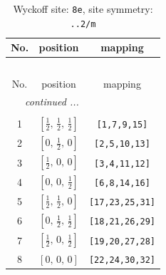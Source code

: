 \documentclass[fleqn,8pt]{jsarticle}
\begin{document}
\renewcommand{\arraystretch}{1.2}
\begin{longtable}{ccc}
\caption{Wyckoff site: {\tt 8e}, site symmetry: {\tt ..2/m}}
 \\
 \hline \hline
No. & position & mapping \\ \hline \endfirsthead

\multicolumn{2}{l}{\tablename\ \thetable{}} \\
 \hline \hline
No. & position & mapping \\ \hline \endhead

 \hline \hline
\multicolumn{2}{r}{\footnotesize\it continued ...} \\ \endfoot

 \hline \hline
\multicolumn{2}{r}{} \\ \endlastfoot

1 & $\left[ \frac{1}{2},\, \frac{1}{2},\, \frac{1}{2} \right]$ & {\tt [1,7,9,15]} \\ \hline
2 & $\left[ 0,\, \frac{1}{2},\, 0 \right]$ & {\tt [2,5,10,13]} \\ \hline
3 & $\left[ \frac{1}{2},\, 0,\, 0 \right]$ & {\tt [3,4,11,12]} \\ \hline
4 & $\left[ 0,\, 0,\, \frac{1}{2} \right]$ & {\tt [6,8,14,16]} \\ \hline
5 & $\left[ \frac{1}{2},\, \frac{1}{2},\, 0 \right]$ & {\tt [17,23,25,31]} \\ \hline
6 & $\left[ 0,\, \frac{1}{2},\, \frac{1}{2} \right]$ & {\tt [18,21,26,29]} \\ \hline
7 & $\left[ \frac{1}{2},\, 0,\, \frac{1}{2} \right]$ & {\tt [19,20,27,28]} \\ \hline
8 & $\left[ 0,\, 0,\, 0 \right]$ & {\tt [22,24,30,32]} \\
\end{longtable}
\renewcommand{\arraystretch}{1.2}
\end{document}
